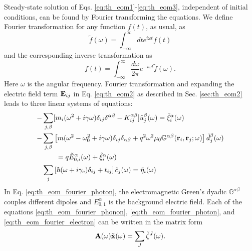 Steady-state solution of Eqs. \eqref{eq:th_eom1}-\eqref{eq:th_eom3}, independent of initial conditions, can be found \cite{chaikin} by Fourier transforming the equations. We define Fourier transformation for any function $f(t)$, as usual, as \cite{chaikin}
\begin{equation}
 \tilde f(\omega) = \int_{-\infty}^{\infty} dt e^{i\omega t} f(t)
\end{equation}
and the corresponding inverse transformation as
\begin{equation}
 f(t) = \int_{-\infty}^{\infty} \frac{d\omega}{2\pi} e^{-i\omega t}\tilde f(\omega).
\end{equation}
Here $\omega$ is the angular frequency. Fourier transformation and expanding the electric field term $\mathbf{E}_{ij}$ in Eq. \eqref{eq:th_eom2} as described in Sec. \ref{sec:th_eom2} leads to three linear systems of equations:
\begin{subequations}
\begin{align}
   - & \sum_{j,\beta}  [m_i (\omega^2+i\gamma \omega) \delta_{ij}\delta^{\alpha\beta} - K_{ij}^{\alpha\beta}] \tilde{u}_j^{\beta}(\omega) = \tilde \xi_i^{\alpha}(\omega) \label{eq:th_eom_fourier_phonon} \\
  - &  \sum_{j,\beta} \left[m(\omega^2-\omega_0^2+i\gamma\omega) \delta_{ij}\delta_{\alpha\beta} +q^2 \omega^2 \mu_0 \mathbb{G}^{\alpha\beta}(\mathbf{r}_i,\mathbf{r}_j;\omega) \right]\tilde{d}_j^{\beta}(\omega) \notag \\
  & \qquad = q\tilde{E}_{0,i}^{\alpha}(\omega) + \tilde{\xi}^{\alpha}_i(\omega) \label{eq:th_eom_fourier_photon} \\ 
  &  \sum_{j} \left[\hbar (\omega+i\gamma_e) \delta_{ij} + t_{ij} \right] \tilde c_j(\omega) = \tilde \eta_i(\omega)   \label{eq:th_eom_fourier_electron}
\end{align}
\end{subequations}
In Eq. \eqref{eq:th_eom_fourier_photon}, the electromagnetic Green's dyadic $\mathbb{G}^{\alpha\beta}$ \cite{novotny} couples different dipoles and $E_{0,1}^{\alpha}$ is the background electric field. Each of the equations \eqref{eq:th_eom_fourier_phonon}, \eqref{eq:th_eom_fourier_photon}, and \eqref{eq:th_eom_fourier_electron} can be written in the matrix form
\begin{equation}
 \mathbf{A}(\omega) \tilde{\mathbf{x}}(\omega) = \sum_J \tilde \zeta^J(\omega). \label{eq:th_general}
\end{equation}
